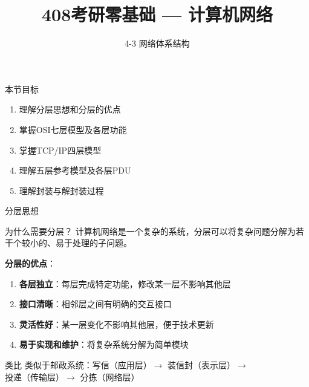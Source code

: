 \documentclass[10pt, aspectratio=169]{beamer}
\title{408考研零基础 --- 计算机网络}
\subtitle{4-3 网络体系结构}
\author{}
\date{}
\begin{document}
\begin{frame}{本节目标}
    \begin{enumerate}
        \item 理解分层思想和分层的优点
        \item 掌握OSI七层模型及各层功能
        \item 掌握TCP/IP四层模型
        \item 理解五层参考模型及各层PDU
        \item 理解封装与解封装过程
    \end{enumerate}
\end{frame}

\begin{frame}{分层思想}
    \begin{block}{为什么需要分层？}
        计算机网络是一个复杂的系统，分层可以将复杂问题分解为若干个较小的、易于处理的子问题。
    \end{block}
    \vspace{0.3em}
    \textbf{分层的优点}：
    \begin{enumerate}
        \item \textbf{各层独立}：每层完成特定功能，修改某一层不影响其他层
        \item \textbf{接口清晰}：相邻层之间有明确的交互接口
        \item \textbf{灵活性好}：某一层变化不影响其他层，便于技术更新
        \item \textbf{易于实现和维护}：将复杂系统分解为简单模块
    \end{enumerate}
    \vspace{0.3em}
    \begin{exampleblock}{类比}
        类似于邮政系统：写信（应用层）$\rightarrow$ 装信封（表示层）$\rightarrow$ 投递（传输层）$\rightarrow$ 分拣（网络层）
    \end{exampleblock}
\end{frame}
\end{document}
